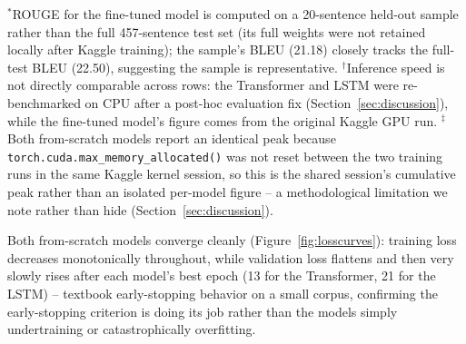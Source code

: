 \documentclass[conference]{IEEEtran}
\begin{document}
\begin{table}[htbp]
\caption{Comparison of Transformer, LSTM, and fine-tuned MarianMT on the UMC005 test set (457 sentence pairs)}
\label{tab:comparison}
\centering
{}
\end{table}
\footnotesize{$^{*}$ROUGE for the fine-tuned model is computed on a 20-sentence
held-out sample rather than the full 457-sentence test set (its full weights
were not retained locally after Kaggle training); the sample's BLEU (21.18)
closely tracks the full-test BLEU (22.50), suggesting the sample is
representative. $^{\dagger}$Inference speed is not directly comparable
across rows: the Transformer and LSTM were re-benchmarked on CPU after a
post-hoc evaluation fix (Section~\ref{sec:discussion}), while the fine-tuned
model's figure comes from the original Kaggle GPU run. $^{\ddagger}$Both
from-scratch models report an identical peak because
\texttt{torch.cuda.max\_memory\_allocated()} was not reset between the two
training runs in the same Kaggle kernel session, so this is the shared
session's cumulative peak rather than an isolated per-model figure -- a
methodological limitation we note rather than hide (Section~\ref{sec:discussion}).}
\par\bigskip

Both from-scratch models converge cleanly (Figure~\ref{fig:losscurves}):
training loss decreases monotonically throughout, while validation loss
flattens and then very slowly rises after each model's best epoch (13 for
the Transformer, 21 for the LSTM) -- textbook early-stopping behavior on a
small corpus, confirming the early-stopping criterion is doing its job
rather than the models simply undertraining or catastrophically overfitting.
\end{document}
